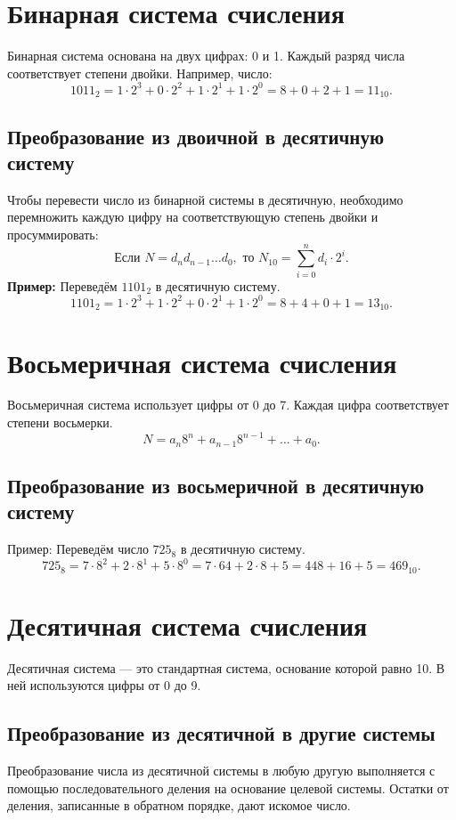 \documentclass[12pt,a4paper]{article}
\begin{document}
\section{Бинарная система счисления}
Бинарная система основана на двух цифрах: 0 и 1. Каждый разряд числа соответствует степени двойки. Например, число:
\[
1011_2 = 1 \cdot 2^3 + 0 \cdot 2^2 + 1 \cdot 2^1 + 1 \cdot 2^0 = 8 + 0 + 2 + 1 = 11_{10}.
\]

\subsection{Преобразование из двоичной в десятичную систему}
Чтобы перевести число из бинарной системы в десятичную, необходимо перемножить каждую цифру на соответствующую степень двойки и просуммировать:
\[
\text{Если } N = d_n d_{n-1}\dots d_0, \text{ то } N_{10} = \sum_{i=0}^{n} d_i \cdot 2^i.
\]
\textbf{Пример:} Переведём \(1101_2\) в десятичную систему.
\[
1101_2 = 1\cdot2^3 + 1\cdot2^2 + 0\cdot2^1 + 1\cdot2^0 = 8 + 4 + 0 + 1 = 13_{10}.
\]

\section{Восьмеричная система счисления}
Восьмеричная система использует цифры от 0 до 7. Каждая цифра соответствует степени восьмерки.
\[
N = a_n 8^n + a_{n-1} 8^{n-1} + \dots + a_0.
\]

\subsection{Преобразование из восьмеричной в десятичную систему}
Пример: Переведём число \(725_8\) в десятичную систему.
\[
725_8 = 7\cdot8^2 + 2\cdot8^1 + 5\cdot8^0 = 7\cdot64 + 2\cdot8 + 5 = 448 + 16 + 5 = 469_{10}.
\]

\section{Десятичная система счисления}
Десятичная система --- это стандартная система, основание которой равно 10. В ней используются цифры от 0 до 9.

\subsection{Преобразование из десятичной в другие системы}
Преобразование числа из десятичной системы в любую другую выполняется с помощью последовательного деления на основание целевой системы. Остатки от деления, записанные в обратном порядке, дают искомое число.
\end{document}
